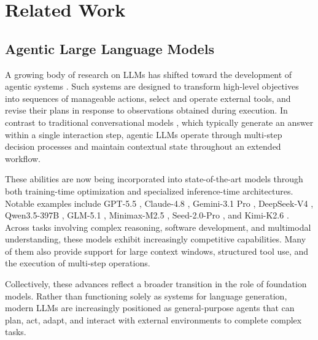 \documentclass{huawei}
\begin{document}
\section{Related Work}
\subsection{Agentic Large Language Models}
A growing body of research on LLMs \cite{naveed2025comprehensive, zhao2023survey, achiam2023gpt, qwenbai2023qwen, liu2024deepseek, guo2025deepseek, xu2026deepseek, yin2024survey} has shifted toward the development of agentic systems \cite{singh2025agentic, wu2025agentic, wu2025agentic1}. Such systems are designed to transform high-level objectives into sequences of manageable actions, select and operate external tools, and revise their plans in response to observations obtained during execution. 
In contrast to traditional conversational models \cite{lewis2020retrieval, gao2023retrieval, mei2025survey, liu2025llm4ranking, gong2026cardrewriter, niu2025distributionally, mei2025dense, niu2025addressing, mei2023improving}, which typically generate an answer within a single interaction step, agentic LLMs \cite{openai2026, anthropic2026, google2026, xu2026deepseek, qwen2026, zeng2026glm, MiniMaxAI2026, seed2026seed2, kimi2026} operate through multi-step decision processes and maintain contextual state throughout an extended workflow.


These abilities are now being incorporated into state-of-the-art models through both training-time optimization and specialized inference-time architectures. Notable examples include GPT-5.5 \cite{openai2026}, Claude-4.8 \cite{anthropic2026}, Gemini-3.1 Pro \cite{google2026}, DeepSeek-V4 \cite{xu2026deepseek}, Qwen3.5-397B \cite{qwen2026}, GLM-5.1 \cite{zeng2026glm}, Minimax-M2.5 \cite{MiniMaxAI2026}, Seed-2.0-Pro \cite{seed2026seed2}, and Kimi-K2.6 \cite{kimi2026}. Across tasks involving complex reasoning, software development, and multimodal understanding, these models exhibit increasingly competitive capabilities. Many of them also provide support for large context windows, structured tool use, and the execution of multi-step operations.


Collectively, these advances reflect a broader transition in the role of foundation models. Rather than functioning solely as systems for language generation, modern LLMs are increasingly positioned as general-purpose agents that can plan, act, adapt, and interact with external environments to complete complex tasks.
\end{document}
